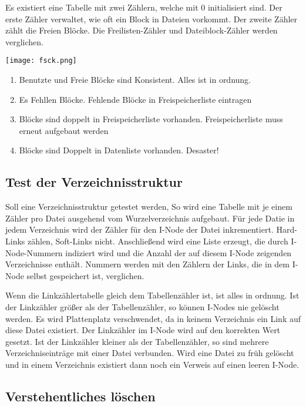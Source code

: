 Es existiert eine Tabelle mit zwei Zählern, welche mit 0 initialisiert sind.
Der erste Zähler verwaltet, wie oft ein Block in Dateien vorkommt. Der zweite
Zähler zählt die Freien Blöcke. Die Freilisten-Zähler und Dateiblock-Zähler
werden verglichen.

\pagebreak

\texttt{[image: fsck.png]}

\begin{enumerate}[label=\alph*.]
    \item Benutzte und Freie Blöcke sind Konsistent. Alles ist in ordnung.
    \item Es Fehllen Blöcke. Fehlende Blöcke in Freispeicherliste eintragen
    \item Blöcke sind doppelt in Freispeicherliste vorhanden. Freispeicherliste muss
          erneut aufgebaut werden
    \item Blöcke sind Doppelt in Datenliste vorhanden. Desaster!
\end{enumerate}

\subsection{Test der Verzeichnisstruktur}

Soll eine Verzeichnisstruktur getestet werden, So wird eine Tabelle mit je
einem Zähler pro Datei ausgehend vom Wurzelverzeichnis aufgebaut. Für jede
Datie in jedem Verzeichnis wird der Zähler für den I-Node der Datei
inkrementiert. Hard-Links zählen, Soft-Links nicht. Anschließend wird eine
Liste erzeugt, die durch I-Node-Nummern indiziert wird und die Anzahl der auf
diesem I-Node zeigenden Verzeichnisse enthält. Nummern werden mit den Zählern
der Links, die in dem I-Node selbst gespeichert ist, verglichen.

Wenn die Linkzählertabelle gleich dem Tabellenzähler ist, ist alles in ordnung.
Ist der Linkzähler größer als der Tabellenzähler, so können I-Nodes nie
gelöscht werden. Es wird Plattenplatz verschwendet, da in keinem Verzeichnis
ein Link auf diese Datei existiert. Der Linkzähler im I-Node wird auf den
korrekten Wert gesetzt. Ist der Linkzähler kleiner als der Tabellenzähler, so
sind mehrere Verzeichniseinträge mit einer Datei verbunden. Wird eine Datei zu
früh gelöscht und in einem Verzeichnis existiert dann noch ein Verweis auf
einen leeren I-Node.

\subsection{Verstehentliches löschen}

